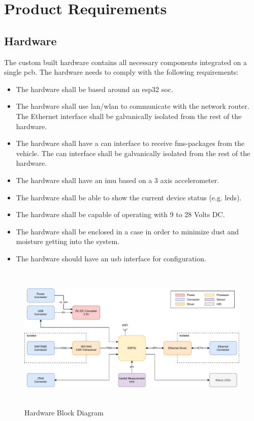 \newpage
\section{Product Requirements}

\subsection{Hardware}
The custom built hardware contains all necessary components integrated on a single \acrfull{pcb}. The hardware needs to comply with the following requirements: 
\begin{itemize}
		\item The hardware shall be based around an \gls{esp32} \acrfull{soc}.
		\item The hardware shall use \acrshort{lan}/\acrshort{wlan} to communicate with the network router.
		\subitem The Ethernet interface shall be galvanically isolated from the rest of the hardware.
		\item The hardware shall have a \acrshort{can} interface to receive \acrshort{fms}-packages from the vehicle.
		\subitem The \acrshort{can} interface shall be galvanically isolated from the rest of the hardware.
		\item The hardware shall have an \acrlong{imu} based on a 3 axis accelerometer.
		\item The hardware shall be able to show the current device status (e.g. \acrshort{led}s).
		\item The hardware shall be capable of operating with 9 to 28 Volts DC.
		\item The hardware shall be enclosed in a case in order to minimize dust and moisture getting into the system.
		\item The hardware should have an \acrshort{usb} interface for configuration.

\end{itemize}

\medskip
\begin{figure}[h!]
	\centering
	\includegraphics[height=7cm]{images/fleet_monitor_hardware}
	\caption{Hardware Block Diagram}
	\label{fig:hardware_block_diagram}
\end{figure}

